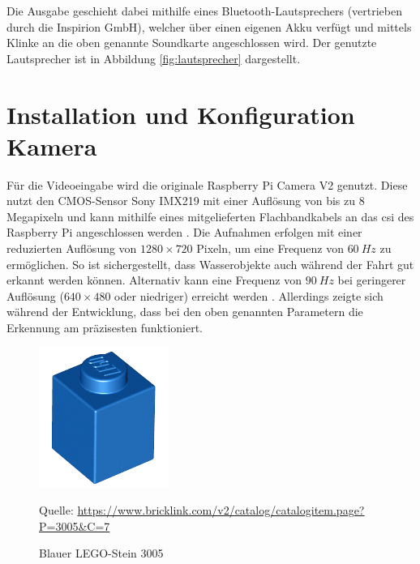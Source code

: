 Die Ausgabe geschieht dabei mithilfe eines Bluetooth-Lautsprechers (vertrieben durch die Inspirion GmbH), welcher über einen eigenen Akku verfügt und mittels Klinke an die oben genannte Soundkarte angeschlossen wird.
Der genutzte Lautsprecher ist in Abbildung \ref{fig:lautsprecher} dargestellt.

\section{Installation und Konfiguration Kamera}
\label{sec:inst_konf_kamera}

Für die Videoeingabe wird die originale Raspberry Pi Camera V2 genutzt.
Diese nutzt den CMOS-Sensor Sony IMX219 mit einer Auflösung von bis zu 8 Megapixeln \cite{pagnutti2017} und kann mithilfe eines mitgelieferten Flachbandkabels an das \acf{csi} des Raspberry Pi angeschlossen werden \cite{halfacree2019}.
Die Aufnahmen erfolgen mit einer reduzierten Auflösung von $1280 \times 720$ Pixeln, um eine Frequenz von $60\ Hz$ zu ermöglichen. 
So ist sichergestellt, dass Wasserobjekte auch während der Fahrt gut erkannt werden können.
Alternativ kann eine Frequenz von $90\ Hz$ bei geringerer Auflösung ($640 \times 480$ oder niedriger) erreicht werden \cite{halfacree2019}.
Allerdings zeigte sich während der Entwicklung, dass bei den oben genannten Parametern die Erkennung am präzisesten funktioniert.

\begin{figure}
	\centering
	\includegraphics[width=0.9\linewidth]{../Images/3005.png}
	\vspace{0.5em}
	\parbox[c]{0.8\linewidth}{\footnotesize
		\centering
		\vspace{1em}
		Quelle: \url{https://www.bricklink.com/v2/catalog/catalogitem.page?P=3005\&C=7}
	}
	\captionsetup{format=plain}
	\caption{Blauer LEGO-Stein 3005}
	\label{fig:lego3005}
\end{figure}

